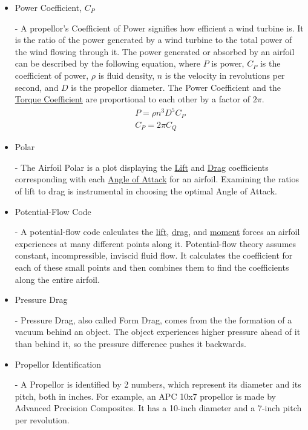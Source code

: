 \documentclass{article}
\begin{document}
\begin{itemize}
	\item \hypertarget{CP}{Power Coefficient, $C_{P}$} - A propellor's Coefficient of Power signifies how efficient a wind turbine is. It is the ratio of the power generated by a wind turbine to the total power of the wind flowing through it. The power generated or absorbed by an airfoil can be described by the following equation, where $P$ is power, $C_{P}$ is the coefficient of power, $\rho$ is fluid density, $n$ is the velocity in revolutions per second, and $D$ is the propellor diameter. The Power Coefficient and the \hyperlink{CT}{Torque Coefficient} are proportional to each other by a factor of $2\pi$.
	\begin{equation}
	\begin{aligned}
		P = \rho n^{3} D^{5} C_{P} \\
		C_{P} = 2 \pi C_{Q}
	\end{aligned}
	\end{equation}

	\item \hypertarget{AP}{Polar} - The Airfoil Polar is a plot displaying the  \hyperlink{CL}{Lift} and  \hyperlink{CD}{Drag} coefficients corresponding with each \hyperlink{alpha}{Angle of Attack} for an airfoil. Examining the ratios of lift to drag is instrumental in choosing the optimal Angle of Attack.
	
	\item \hypertarget{PFC}{Potential-Flow Code} - A potential-flow code calculates the \hyperlink{CL}{lift}, \hyperlink{CD}{drag}, and \hyperlink{CM}{moment} forces an airfoil experiences at many different points along it. Potential-flow theory assumes constant, incompressible, inviscid fluid flow. It calculates the coefficient for each of these small points and then combines them to find the coefficients along the entire airfoil.
		
	\item \hypertarget{DP}{Pressure Drag} - Pressure Drag, also called Form Drag, comes from the the formation of a vacuum behind an object. The object experiences higher pressure ahead of it than behind it, so the pressure difference pushes it backwards.
	
	\item \hypertarget{APC}{Propellor Identification} - A Propellor is identified by 2 numbers, which represent its diameter and its pitch, both in inches. For example, an APC 10x7 propellor is made by Advanced Precision Composites. It has a 10-inch diameter and a 7-inch pitch per revolution.
	

\end{itemize}
\end{document}
